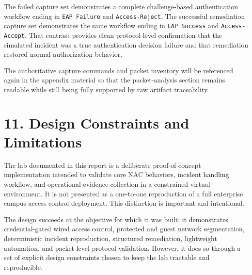 \documentclass[11pt]{article}
\begin{document}
The failed capture set demonstrates a complete challenge-based authentication workflow ending in \texttt{EAP Failure} and \texttt{Access-Reject}. The successful remediation capture set demonstrates the same workflow ending in \texttt{EAP Success} and \texttt{Access-Accept}. That contrast provides clean protocol-level confirmation that the simulated incident was a true authentication decision failure and that remediation restored normal authorization behavior.

The authoritative capture commands and packet inventory will be referenced again in the appendix material so that the packet-analysis section remains readable while still being fully supported by raw artifact traceability.


\section{11. Design Constraints and Limitations}
\label{sec:design-constraints-and-limitations}

The lab documented in this report is a deliberate proof-of-concept implementation intended to validate core NAC behaviors, incident handling workflow, and operational evidence collection in a constrained virtual environment. It is not presented as a one-to-one reproduction of a full enterprise campus access control deployment. This distinction is important and intentional.

The design succeeds at the objective for which it was built: it demonstrates credential-gated wired access control, protected and guest network segmentation, deterministic incident reproduction, structured remediation, lightweight automation, and packet-level protocol validation. However, it does so through a set of explicit design constraints chosen to keep the lab tractable and reproducible.
\end{document}
